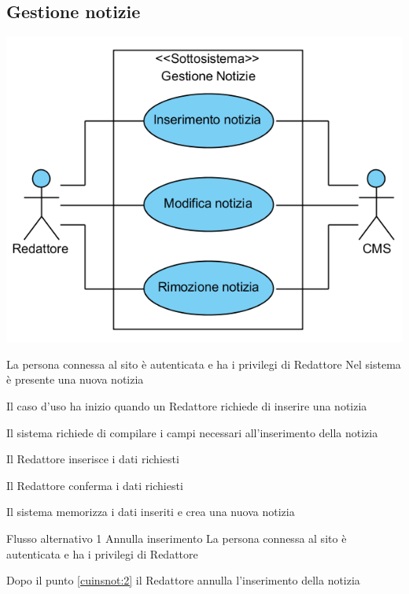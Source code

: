 \subsection{Gestione notizie}
\begin{center}
   \includegraphics[width=\textwidth]{assets/visualParadigm/GestioneNotizie}
\end{center}
%
{}
{La persona connessa al sito è autenticata e ha i privilegi di Redattore}
{Nel sistema è presente una nuova notizia}
{\begin{enumCU}
	\item Il caso d'uso ha inizio quando un Redattore richiede di inserire una notizia  
	\item Il sistema richiede di compilare i campi necessari all'inserimento della notizia
	\item Il Redattore inserisce i dati richiesti \label{cuinsnot:2}
	\item Il Redattore conferma i dati richiesti
	\item Il sistema memorizza i dati inseriti e crea una nuova notizia
\end{enumCU}}
%
{Flusso alternativo 1}%
{Annulla inserimento}%
{La persona connessa al sito è autenticata e ha i privilegi di Redattore}%
{\postNulle}%
{\begin{enumCU}
		\item Dopo il punto \ref{cuinsnot:2} il Redattore annulla l'inserimento della notizia
	\end{enumCU}}%

